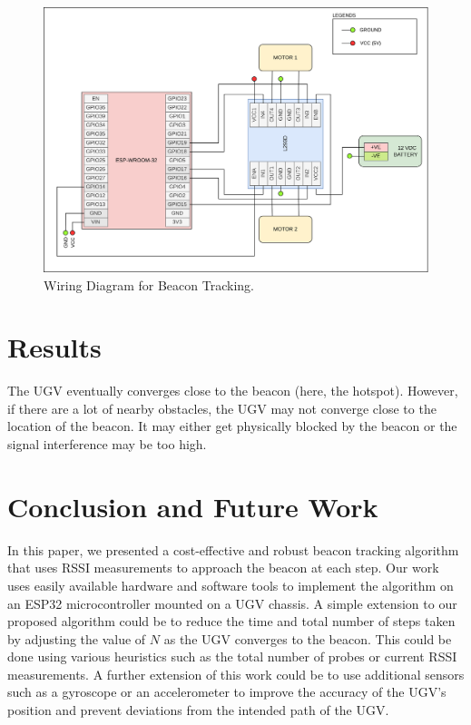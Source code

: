 \documentclass[conference]{IEEEtran}
\begin{document}
\begin{figure}[t]
    \centering
    \includegraphics[width=\columnwidth]{figs/beacon.png}
    \caption{Wiring Diagram for Beacon Tracking.}
    \label{fig:beacon}
\end{figure}

\section{Results}
\label{sec:results}
The UGV eventually converges close to the beacon (here, the hotspot). However,
if there are a lot of nearby obstacles, the UGV may not converge close to the
location of the beacon. It may either get physically blocked by the beacon or
the signal interference may be too high.

\section{Conclusion and Future Work}
\label{sec:conclusion}

In this paper, we presented a cost-effective and robust beacon tracking
algorithm that uses RSSI measurements to approach the beacon at each step. Our
work uses easily available hardware and software tools to implement the
algorithm on an ESP32 microcontroller mounted on a UGV chassis. A simple
extension to our proposed algorithm could be to reduce the time and total number
of steps taken by adjusting the value of \(N\) as the UGV converges to the
beacon. This could be done using various heuristics such as the total number of
probes or current RSSI measurements. A further extension of this work could be
to use additional sensors such as a gyroscope or an accelerometer to improve the
accuracy of the UGV's position and prevent deviations from the intended path of
the UGV.



\end{document}
